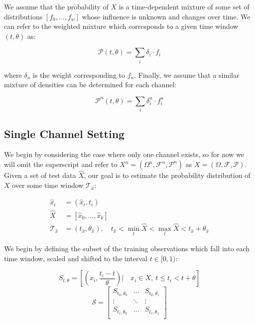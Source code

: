 \documentclass[10pt]{article}
\begin{document}
We assume that the probability of \(X \) is a time-dependent mixture of some set of distributions \( [f_0,...,f_w] \) whose influence is unknown and changes over time.  We can refer to the weighted mixture which corresponds to a given time window \( (t,\theta) \) as:

\begin{equation} \mathcal{P}(t,\theta) = \sum_i \delta_i \cdot f_i \end{equation}

where \( \delta_n \) is the weight corresponding to \( f_n \).  Finally, we assume that a similar mixture of densities can be determined for each channel:

\begin{equation} \mathcal{P}^n(t,\theta) = \sum_i \delta_i^n \cdot f_i^n \end{equation}

\subsection{Single Channel Setting}
We begin by considering the case where only one channel exists, so for now we will omit the superscript and refer to \(X^n = (\Omega^n,\mathcal{F}^n,\mathcal{P}^n) \) as \(X = (\Omega, \mathcal{F},\mathcal{P}) \).  Given a set of test data \( \hat{X} \), our goal is to estimate the probability distribution of \( X \) over some time window \( \mathcal{T}_{\hat{x}} \):

\begin{align*}
\hat{x}_i &= (\hat{x}_i,t_i) \\
\hat{X} &= [ \hat{x}_0,\hdots,\hat{x}_k ] \\
\mathcal{T}_{\hat{x}} &= (t_{\hat{x}}, \theta_{\hat{x}} ), \quad t_{\hat{x}} < \min_t \hat{X} < \max_t \hat{X} < t_{\hat{x}} + \theta_{\hat{x}}
\end{align*}

We begin by defining the subset of the training observations which fall into each time window, scaled and shifted to the interval \( t \in [0,1) \):

\begin{equation} \label{eq:Ssingle} S_{t,\theta} = \left[ \left( x_i,\frac{t_i - t}{\theta} \right) \Big| \quad x_i \in X, \ t \le t_i < t+\theta \right] \end{equation}
\[ \mathcal{S} = 
\begin{bmatrix} 
S_{t_0,\theta_0} & \hdots & S_{t_0,\theta_z} \\
\vdots & \ddots & \vdots \\
S_{t_\ell, \theta_0} & \hdots & S_{t_\ell, \theta_z} \\
\end{bmatrix}  
\]
\end{document}
